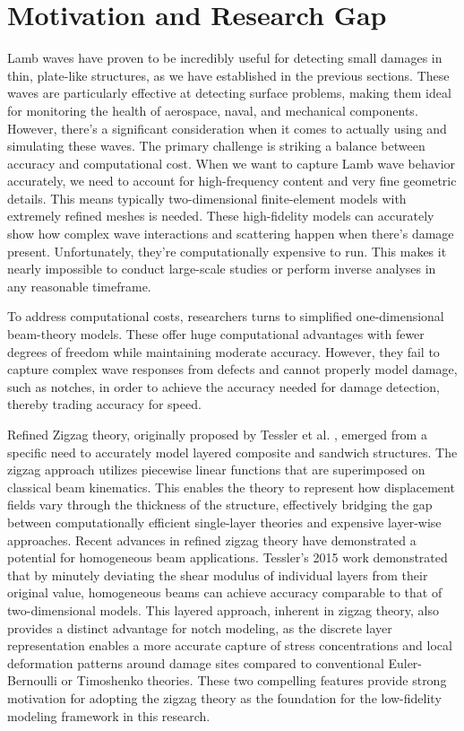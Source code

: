 \documentclass[12pt,a4paper]{report}
\begin{document}
\section{Motivation and Research Gap}
\label{Research Gap}

Lamb waves have proven to be incredibly useful for detecting small damages in thin, plate-like structures, as we have established in the previous sections. These waves are particularly effective at detecting surface problems, making them ideal for monitoring the health of aerospace, naval, and mechanical components. However, there's a significant consideration when it comes to actually using and simulating these waves.
The primary challenge is striking a balance between accuracy and computational cost. When we want to capture Lamb wave behavior accurately, we need to account for high-frequency content and very fine geometric details. This means typically two-dimensional finite-element models with extremely refined meshes is needed. These high-fidelity models can accurately show how complex wave interactions and scattering happen when there's damage present. Unfortunately, they're computationally expensive to run. This makes it nearly impossible to conduct large-scale studies or perform inverse analyses in any reasonable timeframe.

To address computational costs, researchers turns to simplified one-dimensional beam-theory models. These offer huge computational advantages with fewer degrees of freedom while maintaining moderate accuracy. However, they fail to capture complex wave responses from defects and cannot properly model damage, such as notches, in order to achieve the accuracy needed for damage detection, thereby trading accuracy for speed. 

Refined Zigzag theory, originally proposed by Tessler et al. \citep{tessler2007refined}, emerged from a specific need to accurately model layered composite and sandwich structures. The zigzag approach utilizes piecewise linear functions that are superimposed on classical beam kinematics. This enables the theory to represent how displacement fields vary through the thickness of the structure, effectively bridging the gap between computationally efficient single-layer theories and expensive layer-wise approaches.
Recent advances in refined zigzag theory have demonstrated a potential for homogeneous beam applications. Tessler's 2015 work \citep{tessler2015refined} demonstrated that by minutely deviating the shear modulus of individual layers from their original value, homogeneous beams can achieve accuracy comparable to that of two-dimensional models. This layered approach, inherent in zigzag theory, also provides a distinct advantage for notch modeling, as the discrete layer representation enables a more accurate capture of stress concentrations and local deformation patterns around damage sites compared to conventional Euler-Bernoulli or Timoshenko theories. These two compelling features provide strong motivation for adopting the zigzag theory as the foundation for the low-fidelity modeling framework in this research.
\end{document}
